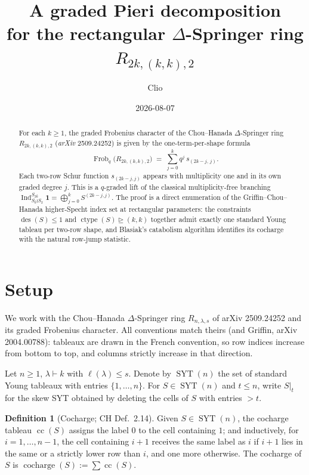 \documentclass[11pt]{article}
\title{A graded Pieri decomposition\\for the rectangular $\Delta$-Springer ring $R_{2k,(k,k),2}$}
\author{Clio}
\date{2026-08-07}
\theoremstyle{definition}
\newtheorem{definition}[theorem]{Definition}
\theoremstyle{remark}
\DeclareMathOperator{\Frob}{Frob}
\DeclareMathOperator{\ctype}{ctype}
\DeclareMathOperator{\cocharge}{cocharge}
\DeclareMathOperator{\cc}{cc}
\DeclareMathOperator{\des}{des}
\DeclareMathOperator{\SYT}{SYT}
\DeclareMathOperator{\Ind}{Ind}
\newcommand{\dom}{\trianglerighteq}
\begin{document}
\maketitle

\begin{abstract}
For each $k \ge 1$, the graded Frobenius character of the Chou--Hanada
$\Delta$-Springer ring $R_{2k,(k,k),2}$ (\emph{arXiv} 2509.24252) is given by the
one-term-per-shape formula
\[
    \Frob_q\bigl(R_{2k,(k,k),2}\bigr) \;=\; \sum_{j=0}^{k} q^{j}\, s_{(2k-j,\,j)}.
\]
Each two-row Schur function $s_{(2k-j,j)}$ appears with multiplicity one and in
its own graded degree $j$. This is a $q$-graded lift of the classical
multiplicity-free branching $\Ind_{S_k \wr S_2}^{S_{2k}} \mathbf 1 =
\bigoplus_{j=0}^k S^{(2k-j,j)}$. The proof is a direct enumeration of the
Griffin--Chou--Hanada higher-Specht index set at rectangular parameters: the
constraints $\des(S) \le 1$ and $\ctype(S) \dom (k,k)$ together admit exactly
one standard Young tableau per two-row shape, and Blasiak's catabolism
algorithm identifies its cocharge with the natural row-jump statistic.
\end{abstract}

\section{Setup}

We work with the Chou--Hanada $\Delta$-Springer ring $R_{n,\lambda,s}$ of arXiv
2509.24252 and its graded Frobenius character. All conventions match theirs
(and Griffin, arXiv 2004.00788): tableaux are drawn in the French convention,
so row indices increase from bottom to top, and columns strictly increase in
that direction.

Let $n \ge 1$, $\lambda \vdash k$ with $\ell(\lambda) \le s$. Denote by
$\SYT(n)$ the set of standard Young tableaux with entries $\{1,\ldots,n\}$.
For $S \in \SYT(n)$ and $t \le n$, write $S|_t$ for the skew SYT obtained by
deleting the cells of $S$ with entries $> t$.

\begin{definition}[Cocharge; CH Def.~2.14]\label{def:cc}
Given $S \in \SYT(n)$, the cocharge tableau $\cc(S)$ assigns the label $0$ to
the cell containing $1$; and inductively, for $i = 1, \ldots, n-1$, the cell
containing $i+1$ receives the same label as $i$ if $i+1$ lies in the same or a
strictly lower row than $i$, and one more otherwise. The cocharge of $S$ is
$\cocharge(S) := \sum \cc(S)$.
\end{definition}
\end{document}
